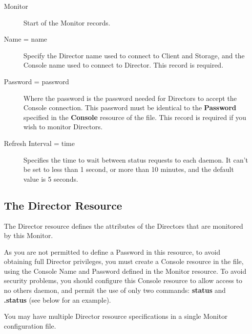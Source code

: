 \begin{description}

\item [Monitor]
   Start of the Monitor records. 

\item [Name = \lt{}name\gt{}]
   Specify the Director name used to connect  to Client and Storage, and the
Console name used to connect to Director.  This record is required. 

\item [Password = \lt{}password\gt{}]
   Where the password is the  password needed for Directors to accept the Console
connection.  This password must be identical to the {\bf Password} specified
in  the {\bf Console} resource of the 
 file. This 
record is required if you wish to monitor Directors. 

\item [Refresh Interval = \lt{}time\gt{}]
   Specifies the time to wait  between status requests to each daemon. It can't
be set to less than  1 second, or more than 10 minutes, and the default value
is 5 seconds. 
\end{description}

\subsection*{The Director Resource}
\label{DirectorResource2}

The Director resource defines the attributes of the Directors that are
monitored by this Monitor.

As you are not permitted to define a Password in this resource, to avoid
obtaining full Director privileges, you must create a Console resource in the 
 file, using the
Console Name and Password defined in the Monitor resource. To avoid security
problems, you should configure this Console resource to allow access to no
others daemon, and permit the use of only two commands: {\bf status} and {\bf
.status} (see below for an example).

You may have multiple Director resource specifications in a single Monitor
configuration file. 

